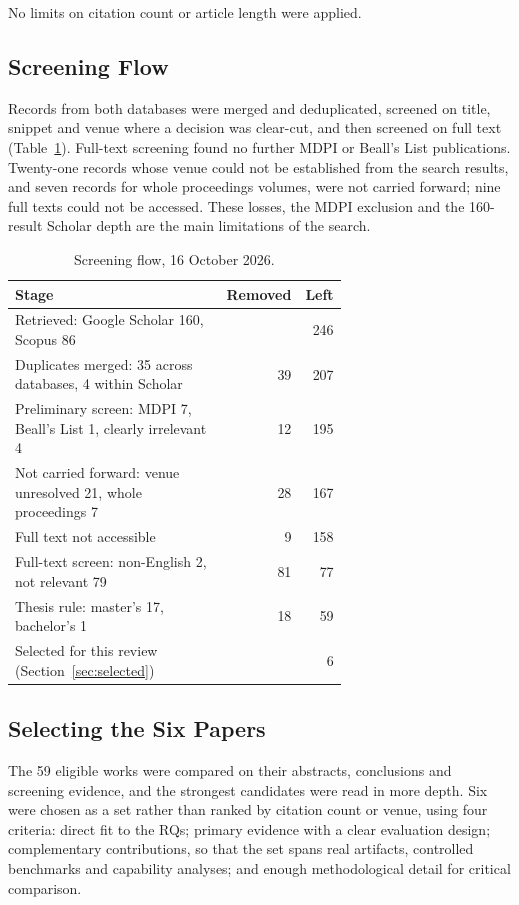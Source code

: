 \documentclass[sigconf,nonacm]{acmart}
\begin{document}
\noindent No limits on citation count or article length were applied.

\subsection{Screening Flow}

Records from both databases were merged and deduplicated, screened on title, snippet and venue where a decision was clear-cut, and then screened on full text (Table~\ref{tab:flow}). Full-text screening found no further MDPI or Beall's List publications. Twenty-one records whose venue could not be established from the search results, and seven records for whole proceedings volumes, were not carried forward; nine full texts could not be accessed. These losses, the MDPI exclusion and the 160-result Scholar depth are the main limitations of the search.

\begin{table}[t]
  \caption{Screening flow, 16 October 2026.}
  \label{tab:flow}
  \small
  \begin{tabular}{@{}p{0.66\linewidth}rr@{}}
    \toprule
    Stage & Removed & Left \\
    \midrule
    Retrieved: Google Scholar 160, Scopus 86 & & 246 \\
    Duplicates merged: 35 across databases, 4 within Scholar & 39 & 207 \\
    Preliminary screen: MDPI 7, Beall's List 1, clearly irrelevant 4 & 12 & 195 \\
    Not carried forward: venue unresolved 21, whole proceedings 7 & 28 & 167 \\
    Full text not accessible & 9 & 158 \\
    Full-text screen: non-English 2, not relevant 79 & 81 & 77 \\
    Thesis rule: master's 17, bachelor's 1 & 18 & 59 \\
    \midrule
    Selected for this review (Section~\ref{sec:selected}) & & 6 \\
    \bottomrule
  \end{tabular}
\end{table}

\subsection{Selecting the Six Papers}

The 59 eligible works were compared on their abstracts, conclusions and screening evidence, and the strongest candidates were read in more depth. Six were chosen as a set rather than ranked by citation count or venue, using four criteria: direct fit to the RQs; primary evidence with a clear evaluation design; complementary contributions, so that the set spans real artifacts, controlled benchmarks and capability analyses; and enough methodological detail for critical comparison.
\end{document}

